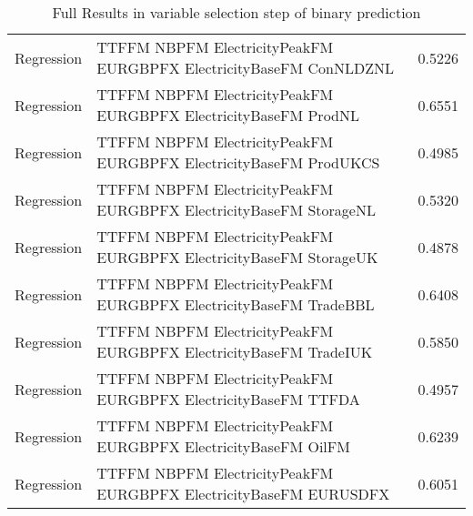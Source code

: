 \begin{table}[h!]
\begin{adjustbox}{max width=\textwidth}
\begin{tabular}{llr}
  Regression & TTFFM NBPFM ElectricityPeakFM EURGBPFX ElectricityBaseFM ConNLDZNL & 0.5226 \\ 
  Regression & TTFFM NBPFM ElectricityPeakFM EURGBPFX ElectricityBaseFM ProdNL & 0.6551 \\ 
  Regression & TTFFM NBPFM ElectricityPeakFM EURGBPFX ElectricityBaseFM ProdUKCS & 0.4985 \\ 
  Regression & TTFFM NBPFM ElectricityPeakFM EURGBPFX ElectricityBaseFM StorageNL & 0.5320 \\ 
  Regression & TTFFM NBPFM ElectricityPeakFM EURGBPFX ElectricityBaseFM StorageUK & 0.4878 \\ 
  Regression & TTFFM NBPFM ElectricityPeakFM EURGBPFX ElectricityBaseFM TradeBBL & 0.6408 \\ 
  Regression & TTFFM NBPFM ElectricityPeakFM EURGBPFX ElectricityBaseFM TradeIUK & 0.5850 \\ 
  Regression & TTFFM NBPFM ElectricityPeakFM EURGBPFX ElectricityBaseFM TTFDA & 0.4957 \\ 
  Regression & TTFFM NBPFM ElectricityPeakFM EURGBPFX ElectricityBaseFM OilFM & 0.6239 \\ 
  Regression & TTFFM NBPFM ElectricityPeakFM EURGBPFX ElectricityBaseFM EURUSDFX & 0.6051 \\ 
   \hline
 \end{tabular}
\end{adjustbox}
\caption{Full Results in variable selection step of binary prediction} 
\label{tab:binary.var.selection.full}
\end{table}

